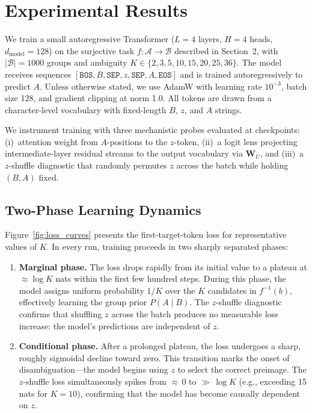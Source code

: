 \section{Experimental Results}

We train a small autoregressive Transformer ($L{=}4$ layers, $H{=}4$ heads, $d_\text{model}{=}128$) on the surjective task $f: \mathcal{A} \to \mathcal{B}$ described in Section~2, with $|\mathcal{B}| = 1000$ groups and ambiguity $K \in \{2, 3, 5, 10, 15, 20, 25, 36\}$. The model receives sequences $[\texttt{BOS}, B, \texttt{SEP}, z, \texttt{SEP}, A, \texttt{EOS}]$ and is trained autoregressively to predict $A$. Unless otherwise stated, we use AdamW with learning rate $10^{-3}$, batch size 128, and gradient clipping at norm 1.0. All tokens are drawn from a character-level vocabulary with fixed-length $B$, $z$, and $A$ strings.

We instrument training with three mechanistic probes evaluated at checkpoints: (i)~attention weight from $A$-positions to the $z$-token, (ii)~a logit lens projecting intermediate-layer residual streams to the output vocabulary via $\mathbf{W}_U$, and (iii)~a $z$-shuffle diagnostic that randomly permutes $z$ across the batch while holding $(B, A)$ fixed.

\subsection{Two-Phase Learning Dynamics}

Figure~\ref{fig:loss_curves} presents the first-target-token loss for representative values of $K$. In every run, training proceeds in two sharply separated phases:

\begin{enumerate}
    \item \textbf{Marginal phase.} The loss drops rapidly from its initial value to a plateau at $\approx \log K$ nats within the first few hundred steps. During this phase, the model assigns uniform probability $1/K$ over the $K$ candidates in $f^{-1}(b)$, effectively learning the group prior $P(A \mid B)$. The $z$-shuffle diagnostic confirms that shuffling $z$ across the batch produces no measurable loss increase: the model's predictions are independent of $z$.

    \item \textbf{Conditional phase.} After a prolonged plateau, the loss undergoes a sharp, roughly sigmoidal decline toward zero. This transition marks the onset of disambiguation---the model begins using $z$ to select the correct preimage. The $z$-shuffle loss simultaneously spikes from ${\approx}\,0$ to ${\gg}\,\log K$ (e.g., exceeding 15 nats for $K{=}10$), confirming that the model has become causally dependent on $z$.
\end{enumerate}

